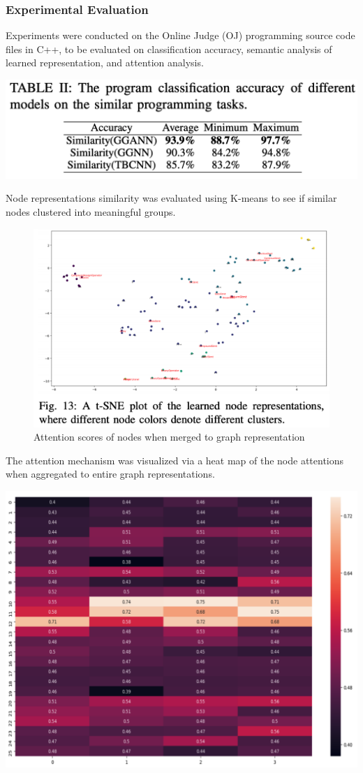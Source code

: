 \documentclass{article}
\begin{document}
\subsubsection{Experimental Evaluation}
Experiments were conducted on the Online Judge (OJ) programming source code files in C++, to be evaluated on classification accuracy, semantic analysis of learned representation, and attention analysis.
\centerline{\includegraphics[width=\columnwidth]{Images/Similarity2-7.png}}
Node representations similarity was evaluated using K-means to see if similar nodes clustered into meaningful groups.
\begin{figure}[ht]
    \centerline{\includegraphics[width=\columnwidth]{Images/Similarity2-8.png}}
    \caption{Attention scores of nodes when merged to graph representation}
\end{figure}

The attention mechanism was visualized via a heat map of the node attentions when aggregated to entire graph representations.
\centerline{\includegraphics[width=\columnwidth]{Images/Similarity2-9.png}}
\end{document}

